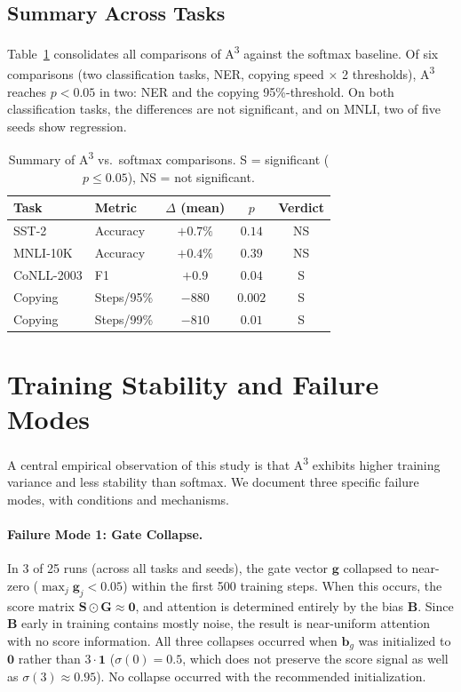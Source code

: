 \documentclass[11pt]{article}
\newcommand{\AAA}{\textsc{A\textsuperscript{3}}}
\newcommand{\bS}{\mathbf{S}}
\newcommand{\bG}{\mathbf{G}}
\newcommand{\bB}{\mathbf{B}}
\newcommand{\bg}{\mathbf{g}}
\newcommand{\bb}{\mathbf{b}}
\begin{document}
\subsection{Summary Across Tasks}

Table~\ref{tab:summary} consolidates all comparisons of \AAA{} against the softmax baseline. Of six comparisons (two classification tasks, NER, copying speed $\times$ 2 thresholds), \AAA{} reaches $p < 0.05$ in two: NER and the copying 95\%-threshold. On both classification tasks, the differences are not significant, and on MNLI, two of five seeds show regression.

\begin{table}[H]
\centering
\caption{Summary of \AAA{} vs.\ softmax comparisons. S = significant ($p \leq 0.05$), NS = not significant.}
\label{tab:summary}
\begin{tabular}{llccc}
\toprule
\textbf{Task} & \textbf{Metric}
  & \textbf{$\Delta$ (mean)} & \textbf{$p$} & \textbf{Verdict} \\
\midrule
SST-2          & Accuracy  & $+0.7\%$ & $0.14$ & NS \\
MNLI-10K       & Accuracy  & $+0.4\%$ & $0.39$ & NS \\
CoNLL-2003     & F1        & $+0.9$   & $0.04$ & S \\
Copying        & Steps/95\%& $-880$   & $0.002$ & S \\
Copying        & Steps/99\%& $-810$   & $0.01$ & S \\
\bottomrule
\end{tabular}
\end{table}

\section{Training Stability and Failure Modes}
\label{sec:stability}

A central empirical observation of this study is that \AAA{} exhibits higher training variance and less stability than softmax. We document three specific failure modes, with conditions and mechanisms.

\paragraph{Failure Mode 1: Gate Collapse.}
In 3 of 25 runs (across all tasks and seeds), the gate vector $\bg$ collapsed to near-zero ($\max_j \bg_j < 0.05$) within the first 500 training steps. When this occurs, the score matrix $\bS \odot \bG \approx \mathbf{0}$, and attention is determined entirely by the bias $\bB$. Since $\bB$ early in training contains mostly noise, the result is near-uniform attention with no score information. All three collapses occurred when $\bb_g$ was initialized to $\mathbf{0}$ rather than $3 \cdot \mathbf{1}$ ($\sigma(0) = 0.5$, which does not preserve the score signal as well as $\sigma(3) \approx 0.95$). No collapse occurred with the recommended initialization.
\end{document}
